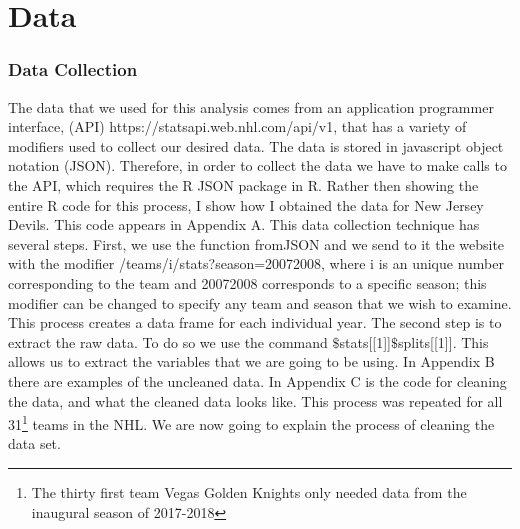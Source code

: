 \chapter{Data}
\subsection*{Data Collection}
The data that we used for this analysis comes from an application programmer interface, (API)  https://statsapi.web.nhl.com/api/v1, that has a variety of modifiers used to collect our desired data. The data is stored in javascript object notation (JSON). Therefore, in order to collect the data we have to make calls to the API, which requires the R JSON package in R. Rather then showing the entire R code for this process, I show how I obtained the data for New Jersey Devils. This code appears in Appendix A. This data collection technique has several steps. First, we use the function fromJSON and we send to it the website with the modifier /teams/i/stats?season=20072008, where i is an unique number corresponding to the team and 20072008 corresponds to a specific season; this modifier can be changed to specify any team and season that we wish to examine. This process creates a data frame for each individual year. The second step is to extract the raw data. To do so we use the command  $\$$stats[[1]]$\$$splits[[1]]. This allows us to extract the variables that we are going to be using. In Appendix B there are examples of the uncleaned data. In Appendix C is the code for cleaning the data, and what the cleaned data looks like. This process was repeated for all 31\footnote{The thirty first team Vegas Golden Knights only needed data from the inaugural season of 2017-2018} teams in the NHL.  We are now going to explain the process of cleaning the data set. 
